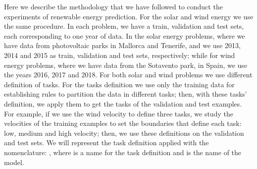 Here we describe the methodology that we have followed to conduct the experiments of renewable energy prediction.
%
For the solar and wind energy we use the same procedure. In each problem, we have a train, validation and test sets, each corresponding to one year of data. In the solar energy problems, where we have data from photovoltaic parks in Mallorca and Tenerife, and we use 2013, 2014 and 2015 as train, validation and test sets, respectively; while for wind energy problems, where we have data from the Sotavento park, in Spain, we use the years 2016, 2017 and 2018.
%
For both solar and wind problems we use different definition of tasks. For the tasks definition we use only the training data for establishing rules to partition the data in different tasks; then, with these tasks' definition, we apply them to get the tasks of the validation and test examples.
%
For example, if we use the wind velocity to define three tasks, we study the velocities of the training examples to set the boundaries that define each task: low, medium and high velocity; then, we use these definitions on the validation and test sets.
%
We will represent the task definition applied with the nomenclature: , where  is a name for the task definition and  is the name of the model.

